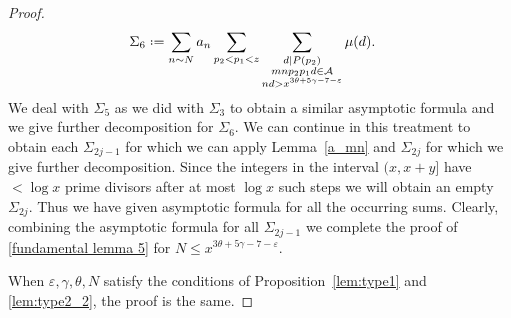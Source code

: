 \documentclass[10pt,a4paper]{amsart}
\newcommand{\cA}{\ensuremath{\mathcal{A}}}
\newcommand*{\defeq}{\mathrel{\vcenter{\baselineskip0.5ex \lineskiplimit0pt
			\hbox{\scriptsize.}\hbox{\scriptsize.}}}%
	=}
\begin{document}
\begin{proof}
\begin{align*}
&\Sigma_6 \defeq \sum_{n \sim N}a_n \sum_{p_2 < p_1 < z} \sum_{\substack{d|P(p_2) \\ mnp_2p_1d \in \cA \\ nd > x^{3\theta+5\gamma-7-\varepsilon}}} \mu(d).
\end{align*}
We deal with $\Sigma_5$ as we did with $\Sigma_3$ to obtain a similar asymptotic formula and we give further decomposition for $\Sigma_6$. We can continue in this treatment to obtain each $\Sigma_{2j-1}$ for which we can apply Lemma~\ref{a_mn} and $\Sigma_{2j}$ for which we give further decomposition. Since the integers in the interval $(x, x+y]$ have $< \log x$ prime divisors after at most $\log x$ such steps we will obtain an empty $\Sigma_{2j}$. Thus we have given asymptotic formula for all the occurring sums. Clearly, combining the asymptotic formula for all $\Sigma_{2j-1}$ we complete the proof of \eqref{fundamental lemma 5} for $N \leqslant x^{3\theta +5\gamma-7 -\varepsilon}$.

When  $\varepsilon, \gamma, \theta, N$ satisfy the conditions of Proposition~\ref{lem:type1} and \ref{lem:type2_2}, the proof is the same. 
\end{proof}
\end{document}
